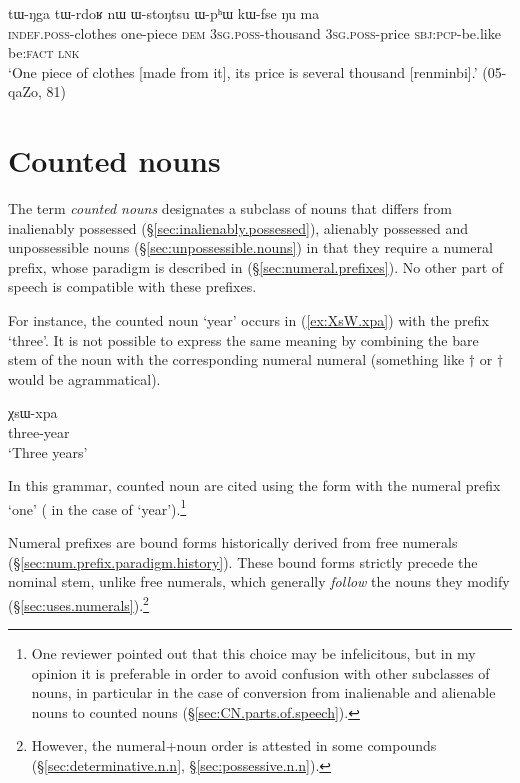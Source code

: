 \begin{exe}
\ex \label{ex:WstoNtsu}
\gll  tɯ-ŋga tɯ-rdoʁ nɯ ɯ-stoŋtsu ɯ-pʰɯ kɯ-fse ŋu ma \\
\textsc{indef}.\textsc{poss}-clothes one-piece \textsc{dem} \textsc{3sg}.\textsc{poss}-thousand \textsc{3sg}.\textsc{poss}-price \textsc{sbj}:\textsc{pcp}-be.like be:\textsc{fact} \textsc{lnk} \\ 
\glt `One piece of clothes [made from it], its price is several thousand [renminbi].' (05-qaZo, 81)
\end{exe}

\section{Counted nouns} \label{sec:counted.nouns}
The term \textit{counted nouns} designates a subclass of nouns that differs from inalienably possessed (§\ref{sec:inalienably.possessed}), alienably possessed and unpossessible nouns (§\ref{sec:unpossessible.nouns}) in that they require a numeral prefix, whose paradigm is described in (§\ref{sec:numeral.prefixes}). No other part of speech is compatible with these prefixes.

For instance, the counted noun  `year' occurs in (\ref{ex:XsW.xpa}) with the prefix  `three'. It is not possible to express the same meaning by combining the bare stem of the noun  with the corresponding numeral numeral  (something  like  $\dagger$ or $\dagger$ would be agrammatical).

\begin{exe}
\ex \label{ex:XsW.xpa}
\gll χsɯ-xpa \\
three-year \\
\glt `Three years'
\end{exe}

In this grammar, counted noun are cited using the form with the numeral prefix `one' ( in the case of `year').\footnote{One reviewer pointed out that this choice may be infelicitous, but in my opinion it is preferable in order to avoid confusion with other subclasses of nouns, in particular in the case of conversion from inalienable and alienable nouns to counted nouns (§\ref{sec:CN.parts.of.speech}). }

Numeral prefixes are bound forms historically derived from free numerals (§\ref{sec:num.prefix.paradigm.history}). These bound forms strictly precede the nominal stem, unlike free numerals, which generally \textit{follow} the nouns they modify  (§\ref{sec:uses.numerals}).\footnote{However, the numeral+noun order is attested in some compounds (§\ref{sec:determinative.n.n}, §\ref{sec:possessive.n.n}). }

